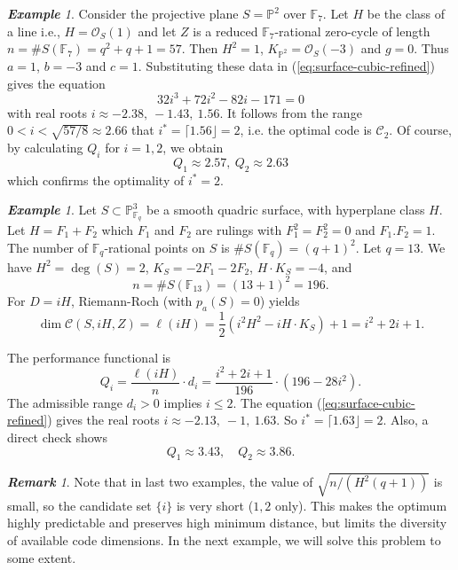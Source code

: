 \documentclass[14pt]{amsart}
\theoremstyle{plain}
\theoremstyle{definition}
\theoremstyle{remark}
\newtheorem{rem}[thm]{\bf Remark}
\newtheorem{exam}[thm]{\bf Example}
\theoremstyle{example}
\def \P{\mathbb{P}}
\def \F{\mathbb{F}}
\def \O{\mathcal{O}}
\def \C{\mathcal{C}}
\begin{document}
\begin{exam}
Consider the projective plane $S=\P^2$ over $\F_7$. Let $H$ be the class of a line i.e., $H=\O_S(1)$ and let $Z$ is a reduced $\F_7$-rational zero-cycle of length $n=\# S(\F_7)=q^2+q+1=57$. Then $H^2=1$, $K_{\P^2}=\O_S(-3)$ and $g=0$. Thus $a=1$, $b=-3$ and $c=1$. Substituting these data in (\ref{eq:surface-cubic-refined}) gives the equation 
$$32i^3+72i^2-82i-171=0$$
with real roots $i\approx -2.38,\ -1.43,\ 1.56$. It follows from the range $0< i<\sqrt{57/8}\approx 2.66$ that $i^*=\lceil 1.56\rfloor=2$, i.e. the optimal code is $\C_2$. Of course, by calculating $Q_i$ for $i=1,2$, we obtain
$$Q_1\approx 2.57,\ Q_2\approx 2.63$$
which confirms the optimality of $i^*=2$.
\end{exam}

\begin{exam}
Let $S \subset \P^3_{\F_{q}}$ be a smooth quadric surface, with hyperplane class $H$. Let $H=F_1+F_2$ which $F_1$ and $F_2$ are rulings with $F^2_1=F^2_2=0$ and $F_1.F_2=1$. The number of $\F_q$-rational points on $S$ is $\# S(\F_q)=(q+1)^2.$ Let $q=13$. We have $H^2=\deg(S)=2$, $K_S=-2F_1-2F_2$, $H \cdot K_S =-4$, and
$$n=\# S(\F_{13})=(13+1)^2=196.$$
For $D=iH$, Riemann-Roch (with $p_a(S)=0$) yields
$$\dim \C(S,iH,Z)=\ell(iH)=\frac{1}{2}\left(i^2 H^2-iH\cdot K_S \right)+1=i^2+2i+1.$$

The performance functional is
$$Q_i=\frac{\ell(iH)}{n}\cdot d_i=\frac{i^2+2i+1}{196}\cdot\left(196-28i^2\right).$$
The admissible range $d_i>0$ implies $i\leq 2$. The equation (\ref{eq:surface-cubic-refined}) gives the real roots $i\approx -2.13,\ -1,\ 1.63$. So $i^*=\lceil 1.63\rfloor=2$.
Also, a direct check shows
$$Q_1\approx 3.43,\quad Q_2\approx 3.86.$$

\end{exam}

\begin{rem}
Note that in last two examples, the value of $\sqrt{n/(H^2(q+1))}$ is small, so the candidate set $\{i\}$ is very short ($1,2$ only). This makes the optimum highly predictable and preserves high minimum distance, but limits the diversity of available code dimensions. In the next example, we will solve this problem to some extent.
\end{rem}
\end{document}
